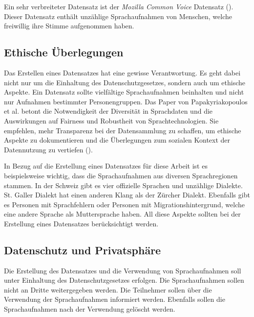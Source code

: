 \documentclass[11pt,a4paper]{article}
\begin{document}
\noindent \newline
Ein sehr verbreiteter Datensatz ist der \textit{Mozilla Common Voice} Datensatz
(\cite{ardila2020common}). Dieser Datensatz enthält unzählige Sprachaufnahmen von Menschen, welche
freiwillig ihre Stimme aufgenommen haben. 

\subsection{Ethische Überlegungen}
Das Erstellen eines Datensatzes hat eine gewisse Verantwortung. Es geht dabei nicht nur um die 
Einhaltung des Datenschutzgesetzes, sondern auch um ethische Aspekte. Ein Datensatz sollte 
vielfältige Sprachaufnahmen beinhalten und nicht nur Aufnahmen bestimmter Personengruppen. Das 
Paper von Papakyriakopoulos et al. betont die Notwendigkeit der Diversität in Sprachdaten und die 
Auswirkungen auf Fairness und Robustheit von Sprachtechnologien. Sie empfehlen, mehr Transparenz 
bei der Datensammlung zu schaffen, um ethische Aspekte zu dokumentieren und die Überlegungen zum 
sozialen Kontext der Datennutzung zu vertiefen (\cite{papakyriakopoulos2023augmented}).

\noindent \newline
In Bezug auf die Erstellung eines Datensatzes für diese Arbeit ist es beispielsweise wichtig, dass 
die Sprachaufnahmen aus diversen Sprachregionen stammen. In der Schweiz gibt es vier offizielle 
Sprachen und unzählige Dialekte. St. Galler Dialekt hat einen anderen Klang als der Zürcher Dialekt.
Ebenfalls gibt es Personen mit Sprachfehlern oder Personen mit Migrationshintergrund, welche eine andere Sprache als 
Muttersprache haben. All diese Aspekte sollten bei der Erstellung eines Datensatzes berücksichtigt 
werden.

\subsection{Datenschutz und Privatsphäre}
Die Erstellung des Datensatzes und die Verwendung von Sprachaufnahmen soll unter Einhaltung des 
Datenschutzgesetzes erfolgen. Die Sprachaufnahmen sollen nicht an Dritte weitergegeben werden. Die 
Teilnehmer sollen über die Verwendung der Sprachaufnahmen informiert werden. Ebenfalls sollen die 
Sprachaufnahmen nach der Verwendung gelöscht werden. 
\end{document}
